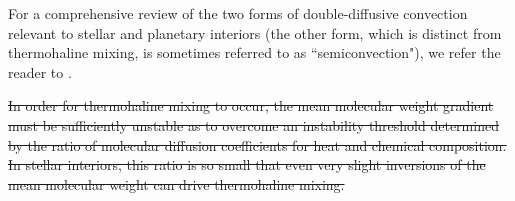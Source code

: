 For a comprehensive review of the two forms of double-diffusive convection relevant to stellar and planetary interiors (the other form, which is distinct from thermohaline mixing, is sometimes referred to as ``semiconvection"), %
we refer the reader to \citet{garaud_DDC_review_2018}. 

\sout{In order for thermohaline mixing to occur, the mean molecular weight gradient must be sufficiently unstable as to overcome an instability threshold determined by the ratio of molecular diffusion coefficients for heat and chemical composition. 
In stellar interiors, this ratio is so small that even very slight inversions of the mean molecular weight can drive thermohaline mixing.}




